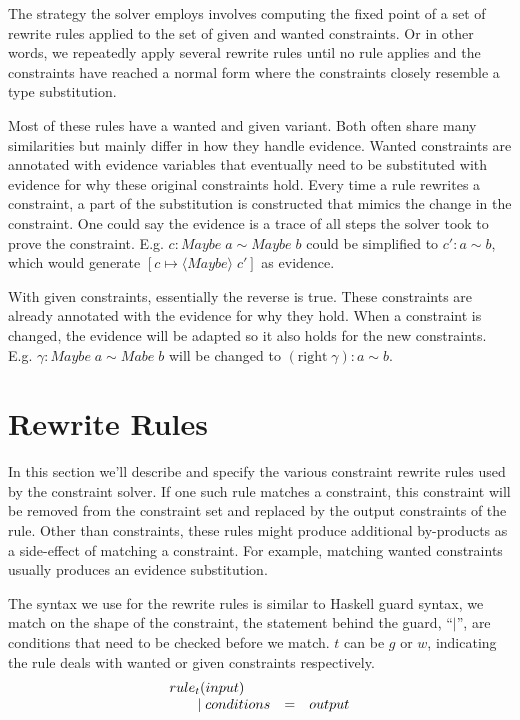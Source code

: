 The strategy the solver employs involves computing the fixed point of a set of
rewrite rules applied to the set of given and wanted constraints. Or in other
words, we repeatedly apply several rewrite rules until no rule applies and the
constraints have reached a normal form where the constraints closely resemble a
type substitution.

Most of these rules have a wanted and given variant. Both often share many
similarities but mainly differ in how they handle evidence. Wanted constraints
are annotated with evidence variables that eventually need to be substituted
with evidence for why these original constraints hold. Every time a rule
rewrites a constraint, a part of the substitution is constructed that mimics the
change in the constraint. One could say the evidence is a trace of all steps the
solver took to prove the constraint. E.g. $c : Maybe \; a \sim Maybe \; b$ could
be simplified to $c': a \sim b$, which would generate $[c \mapsto \langle Maybe
\rangle \; c']$ as evidence.

With given constraints, essentially the reverse is true. These constraints are
already annotated with the evidence for why they hold. When a constraint is
changed, the evidence will be adapted so it also holds for the new constraints.
E.g.  $\gamma : Maybe \; a \sim Mabe \; b$ will be changed to $(\text{right}\;
\gamma) : a \sim b$.

\section{Rewrite Rules}
In this section we'll describe and specify the various constraint rewrite rules
used by the constraint solver. If one such rule matches a constraint, this
constraint will be removed from the constraint set and replaced by the output
constraints of the rule. Other than constraints, these rules might produce
additional by-products as a side-effect of matching a constraint. For example,
matching wanted constraints usually produces an evidence substitution.

The syntax we use for the rewrite rules is similar to Haskell guard syntax, we
match on the shape of the constraint, the statement behind the guard,
``$\mid$'', are conditions that need to be checked before we match. $t$ can be
$g$ or $w$, indicating the rule deals with wanted or given constraints
respectively.
\[
\begin{array}{l c l}
rule_t(input)
\\\qquad \mid conditions &=& output
\end{array}
\]

